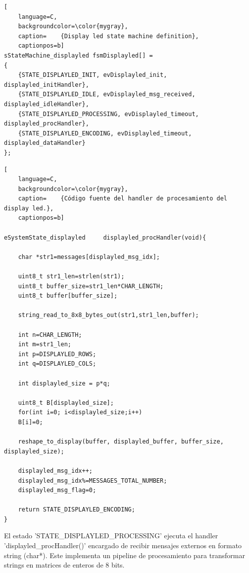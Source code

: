 \begin{lstlisting}[
	language=C, 
	backgroundcolor=\color{mygray},
	caption=	{Display led state machine definition},
	captionpos=b]
sStateMachine_displayled fsmDisplayled[] = 
{
    {STATE_DISPLAYLED_INIT, evDisplayled_init, displayled_initHandler},
    {STATE_DISPLAYLED_IDLE, evDisplayled_msg_received, displayled_idleHandler},
    {STATE_DISPLAYLED_PROCESSING, evDisplayled_timeout, displayled_procHandler},
    {STATE_DISPLAYLED_ENCODING, evDisplayled_timeout, displayled_dataHandler}
};
\end{lstlisting}
\label{code:fsmDisplay}



\begin{lstlisting}[
	language=C, 
	backgroundcolor=\color{mygray},
	caption=	{Código fuente del handler de procesamiento del display led.},
	captionpos=b]

eSystemState_displayled     displayled_procHandler(void){

    char *str1=messages[displayled_msg_idx];

    uint8_t str1_len=strlen(str1);
    uint8_t buffer_size=str1_len*CHAR_LENGTH;
    uint8_t buffer[buffer_size];

    string_read_to_8x8_bytes_out(str1,str1_len,buffer);

    int n=CHAR_LENGTH; 
    int m=str1_len;
    int p=DISPLAYLED_ROWS;
    int q=DISPLAYLED_COLS;

    int displayled_size = p*q;

    uint8_t B[displayled_size];
    for(int i=0; i<displayled_size;i++)
    B[i]=0;

    reshape_to_display(buffer, displayled_buffer, buffer_size, displayled_size);

    displayled_msg_idx++;
    displayled_msg_idx%=MESSAGES_TOTAL_NUMBER;
    displayled_msg_flag=0;

    return STATE_DISPLAYLED_ENCODING;
}

\end{lstlisting}

El estado 'STATE\_DISPLAYLED\_PROCESSING' ejecuta el handler  'displayled\_procHandler()' encargado de recibir mensajes externos en formato string (char*). Este implementa un pipeline de procesamiento para transformar strings en matrices de enteros de 8 bits.



